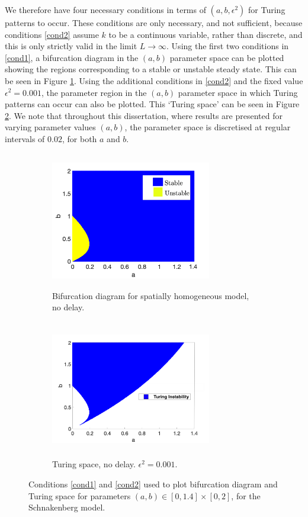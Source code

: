 We therefore have four necessary conditions in terms of $(a,b,\epsilon^2)$ for Turing patterns to occur. These conditions are only necessary, and not sufficient, because conditions \eqref{cond2} assume $k$ to be a continuous variable, rather than discrete, and this is only strictly valid in the limit $L\to\infty$. Using the first two conditions in \eqref{cond1}, a bifurcation diagram in the $(a,b)$ parameter space can be plotted showing the regions corresponding to a stable or unstable steady state. This can be seen in Figure \ref{fig:bifsh}. Using the additional conditions in \eqref{cond2} and the fixed value $\epsilon^2=0.001$, the parameter region in the $(a,b)$ parameter space in which Turing patterns can occur can also be plotted. This `Turing space' can be seen in Figure \ref{fig:turingspace}. We note that throughout this dissertation, where results are presented for varying parameter values $(a,b)$, the parameter space is discretised at regular intervals of $0.02$, for both $a$ and $b$.

\begin{figure}[H]
    \centering
    \begin{subfigure}[t]{0.45\textwidth}
        \centering
        \includegraphics[width=7cm,height = 6cm]{bifsh1.png}
        \caption{Bifurcation diagram for spatially homogeneous model, no delay.}
        \label{fig:bifsh}
    \end{subfigure}
    \hfill
    \begin{subfigure}[t]{0.45\textwidth}
        \centering
        \includegraphics[width=7cm,height = 6cm]{turingspace.png}
        \caption{Turing space, no delay. $\epsilon^2=0.001$.}
        \label{fig:turingspace}
    \end{subfigure}
    \caption{Conditions \eqref{cond1} and \eqref{cond2} used to plot bifurcation diagram and Turing space for parameters $(a,b)\in[0,1.4]\times[0,2]$, for the Schnakenberg model.}
    \label{fig:dispfixed}
\end{figure}

